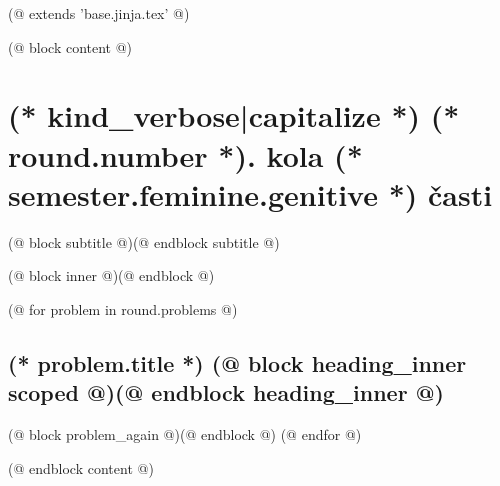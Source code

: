 (@ extends 'base.jinja.tex' @)

(@ block content @)
    \thispagestyle{seminar-booklet-first}

    \afterpage{\globaldefs=1\restoregeometry}

    \pagestyle{seminar-booklet-body}


    \section{%
        \texorpdfstring{%
            (* kind_verbose|capitalize *) (* round.number *). kola (* semester.feminine.genitive *) časti%
        }{%
            (* kind_verbose|capitalize *)%
        }%
    }
    (@ block subtitle @)(@ endblock subtitle @)

    \setcounter{volume}{(* volume.number *)}
    \setcounter{semester}{(* semester.number *)}
    \setcounter{round}{(* round.number *)}
    \setcounter{section}{(* round.number *)}
    (@ block inner @)(@ endblock @)

    (@ for problem in round.problems @)%
        \setcounter{problem}{(* problem.number *)}%
        \hypertarget{(* volume.id *)(* semester.id *)(* round.id *)(* problem.id *)-(* kind *)}{
            \subsection{%
                \texorpdfstring{%
                    \large \textbf{(* problem.title *)} \hfill \normalsize%
                    (@ block heading_inner scoped @)(@ endblock heading_inner @)%
                }{%
                    (* round.number *).(* problem.number *) (* problem.title *)%
                }%
            }%
            \label{sec:(* volume.id *)(* semester.id *)(* round.id *)(* problem.id *):(* kind *)}
        }%
        (@ block problem_again @)(@ endblock @)
    (@ endfor @)

(@ endblock content @)
